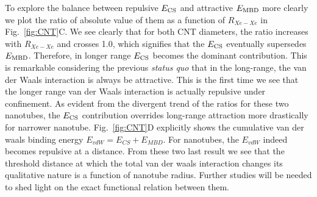 \documentclass[aps,prl,groupaddress, twocolumn]{revtex4-1}  %
\begin{document}
To explore the balance between repulsive $E_{\rm CS}$ and attractive $E_{\rm MBD}$ more clearly we plot the ratio of absolute value of them as a function of $R_{Xe-Xe}$ in Fig.~\ref{fig:CNT}C. We see clearly that for both CNT diameters, the ratio increases with $R_{Xe-Xe}$ and crosses 1.0, which signifies that the $E_{\rm CS}$ eventually supersedes $E_{\rm MBD}$. Therefore, in longer range $E_{\rm CS}$ becomes the dominant contribution. This is remarkable considering the previous \textit{status quo} that in the long-range, the van der Waals interaction is always be attractive. This is the first time we see that the longer range van der Waals interaction is actually repulsive under confinement. As evident from the divergent trend of the ratios for these two nanotubes, the $E_{\rm CS}$ contribution overrides long-range attraction more drastically for narrower nanotube. Fig.~\ref{fig:CNT}D explicitly shows the cumulative van der waals binding energy $E_{vdW} = E_{CS} + E_{MBD}$. For nanotubes, the $E_{vdW}$ indeed becomes repulsive at a distance. From these two last result we see that the threshold distance at which the total van der waals interaction changes its qualitative nature is a function of nanotube radius. Further studies will be needed to shed light on the exact functional relation between them. 
\end{document}
